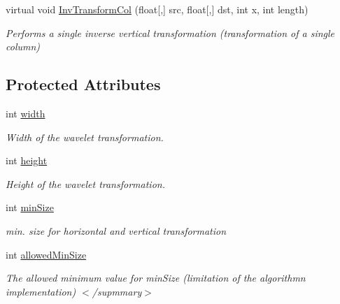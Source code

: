 \begin{DoxyCompactItemize}
virtual void \hyperlink{class_turbo_wavelets_1_1_wavelet2_d_a9897e5e3f830ab7ea106e6bcf367fa07}{\-Inv\-Transform\-Col} (float\mbox{[},\mbox{]} src, float\mbox{[},\mbox{]} dst, int x, int length)
\begin{DoxyCompactList}\small\item\em \-Performs a single inverse vertical transformation (transformation of a single column) \end{DoxyCompactList}\end{DoxyCompactItemize}
\subsection*{\-Protected \-Attributes}
\begin{DoxyCompactItemize}
\item 
int \hyperlink{class_turbo_wavelets_1_1_wavelet2_d_aaa4b3711957fe1798980e6891331a08d}{width}
\begin{DoxyCompactList}\small\item\em \-Width of the wavelet transformation. \end{DoxyCompactList}\item 
int \hyperlink{class_turbo_wavelets_1_1_wavelet2_d_afb2aa87b89b82f329357cbdc0cde18a8}{height}
\begin{DoxyCompactList}\small\item\em \-Height of the wavelet transformation. \end{DoxyCompactList}\item 
int \hyperlink{class_turbo_wavelets_1_1_wavelet2_d_af5148ef1a46dd5694ccea13aa8f1b9e2}{min\-Size}
\begin{DoxyCompactList}\small\item\em min. size for horizontal and vertical transformation \end{DoxyCompactList}\item 
\hypertarget{class_turbo_wavelets_1_1_wavelet2_d_a949bac2b4f540092cf7cc8916968cdc0}{int \hyperlink{class_turbo_wavelets_1_1_wavelet2_d_a949bac2b4f540092cf7cc8916968cdc0}{allowed\-Min\-Size}}\label{class_turbo_wavelets_1_1_wavelet2_d_a949bac2b4f540092cf7cc8916968cdc0}

\begin{DoxyCompactList}\small\item\em \-The allowed minimum value for min\-Size (limitation of the algorithmn implementation) $<$/supmmary$>$ \end{DoxyCompactList}\end{DoxyCompactItemize}
